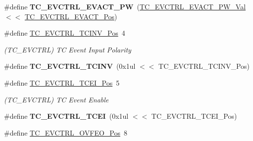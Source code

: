 \begin{DoxyCompactItemize}
\item 
\hypertarget{group___s_a_m_l21___t_c_ga9e596c30365d441cba2d1408a5ab2630}{}\#define {\bfseries T\+C\+\_\+\+E\+V\+C\+T\+R\+L\+\_\+\+E\+V\+A\+C\+T\+\_\+\+P\+W}~(\hyperlink{group___s_a_m_l21___t_c_gae6a07dc676f087732e57795d11096682}{T\+C\+\_\+\+E\+V\+C\+T\+R\+L\+\_\+\+E\+V\+A\+C\+T\+\_\+\+P\+W\+\_\+\+Val}        $<$$<$ \hyperlink{group___s_a_m_l21___t_c_ga29f3c9802b04bc3c9e151e388abf2f08}{T\+C\+\_\+\+E\+V\+C\+T\+R\+L\+\_\+\+E\+V\+A\+C\+T\+\_\+\+Pos})\label{group___s_a_m_l21___t_c_ga9e596c30365d441cba2d1408a5ab2630}

\item 
\hypertarget{group___s_a_m_l21___t_c_gaf706c5718d05a7f5a8745d49156cc87d}{}\#define \hyperlink{group___s_a_m_l21___t_c_gaf706c5718d05a7f5a8745d49156cc87d}{T\+C\+\_\+\+E\+V\+C\+T\+R\+L\+\_\+\+T\+C\+I\+N\+V\+\_\+\+Pos}~4\label{group___s_a_m_l21___t_c_gaf706c5718d05a7f5a8745d49156cc87d}

\begin{DoxyCompactList}\small\item\em (T\+C\+\_\+\+E\+V\+C\+T\+R\+L) T\+C Event Input Polarity \end{DoxyCompactList}\item 
\hypertarget{group___s_a_m_l21___t_c_ga8af414bb1d73822a23ca6ca4e18a4ef8}{}\#define {\bfseries T\+C\+\_\+\+E\+V\+C\+T\+R\+L\+\_\+\+T\+C\+I\+N\+V}~(0x1ul $<$$<$ T\+C\+\_\+\+E\+V\+C\+T\+R\+L\+\_\+\+T\+C\+I\+N\+V\+\_\+\+Pos)\label{group___s_a_m_l21___t_c_ga8af414bb1d73822a23ca6ca4e18a4ef8}

\item 
\hypertarget{group___s_a_m_l21___t_c_ga96f939ff66c8f81ddf4d6c983eb36552}{}\#define \hyperlink{group___s_a_m_l21___t_c_ga96f939ff66c8f81ddf4d6c983eb36552}{T\+C\+\_\+\+E\+V\+C\+T\+R\+L\+\_\+\+T\+C\+E\+I\+\_\+\+Pos}~5\label{group___s_a_m_l21___t_c_ga96f939ff66c8f81ddf4d6c983eb36552}

\begin{DoxyCompactList}\small\item\em (T\+C\+\_\+\+E\+V\+C\+T\+R\+L) T\+C Event Enable \end{DoxyCompactList}\item 
\hypertarget{group___s_a_m_l21___t_c_ga8e11ba23e105afdb6d457321a74ea6c8}{}\#define {\bfseries T\+C\+\_\+\+E\+V\+C\+T\+R\+L\+\_\+\+T\+C\+E\+I}~(0x1ul $<$$<$ T\+C\+\_\+\+E\+V\+C\+T\+R\+L\+\_\+\+T\+C\+E\+I\+\_\+\+Pos)\label{group___s_a_m_l21___t_c_ga8e11ba23e105afdb6d457321a74ea6c8}

\item 
\hypertarget{group___s_a_m_l21___t_c_ga79846c99ff75707e96ba7b4e4da1ceeb}{}\#define \hyperlink{group___s_a_m_l21___t_c_ga79846c99ff75707e96ba7b4e4da1ceeb}{T\+C\+\_\+\+E\+V\+C\+T\+R\+L\+\_\+\+O\+V\+F\+E\+O\+\_\+\+Pos}~8\label{group___s_a_m_l21___t_c_ga79846c99ff75707e96ba7b4e4da1ceeb}


\end{DoxyCompactItemize}
